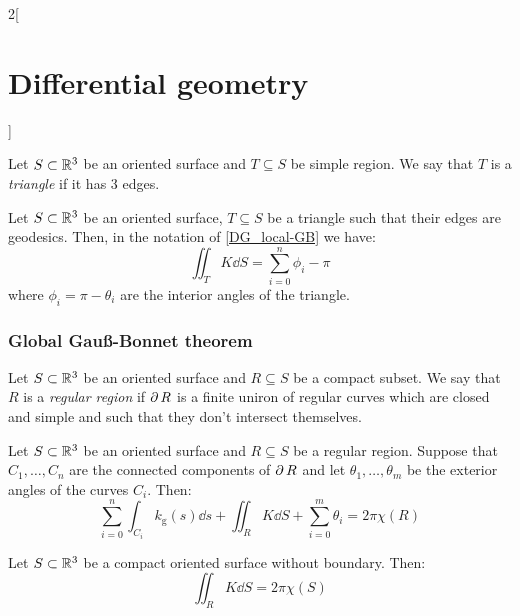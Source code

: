 \documentclass[../../../main.tex]{subfiles}
\begin{document}
\begin{multicols}{2}[\section{Differential geometry}]
\begin{theorem}
  \end{theorem}
  \begin{definition}
    Let $S\subset\mathbb{R}^3$ be an oriented surface and $T\subseteq S$ be simple region. We say that $T$ is a \emph{triangle} if it has 3 edges.
  \end{definition}
  \begin{corollary}
    Let $S\subset\mathbb{R}^3$ be an oriented surface, $T\subseteq S$ be a triangle such that their edges are geodesics. Then, in the notation of \cref{DG_local-GB} we have: $$\iint_{T}K\dd{S}=\sum_{i=0}^n\phi_i-\pi$$
    where $\phi_i=\pi-\theta_i$ are the interior angles of the triangle.
  \end{corollary}
  \subsubsection{Global Gau\ss-Bonnet theorem}
  \begin{definition}
    Let $S\subset\mathbb{R}^3$ be an oriented surface and $R\subseteq S$ be a compact subset. We say that $R$ is a \emph{regular region} if $\operatorname{\partial}{R}$ is a finite uniron of regular curves which are closed and simple and such that they don't intersect themselves.
  \end{definition}
  \begin{theorem}
    Let $S\subset\mathbb{R}^3$ be an oriented surface and $R\subseteq S$ be a regular region. Suppose that $C_1,\ldots,C_n$ are the connected components of $\operatorname{\partial}{R}$ and let $\theta_1,\ldots,\theta_m$ be the exterior angles of the curves $C_i$. Then: $$\sum_{i=0}^n\int_{C_i}k_{\text{g}}(s)\dd{s}+\iint_{R}K\dd{S}+\sum_{i=0}^m\theta_i=2\pi\chi(R)$$
  \end{theorem}
  \begin{corollary}
    Let $S\subset\mathbb{R}^3$ be a compact oriented surface without boundary. Then: $$\iint_{R}K\dd{S}=2\pi\chi(S)$$
  \end{corollary}

\end{multicols}
\end{document}
